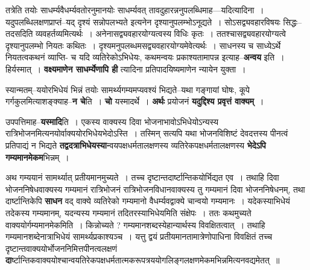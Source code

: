 \documentclass[article,12pt,a4paper]{memoir}
\begin{document}
	तत्रेति तयोः साधर्म्यवैधर्म्यवतोरनुमानयोः साधर्म्यवत् तावदुहारन्ननुपलब्धिमाह—यदित्यादिना । यदुपलब्धिलक्षणप्राप्तं--यद् दृश्यं सन्नोपलभ्यते इत्यनेन दृश्यानुपलम्भोऽनूद्यते । सोऽसद्व्यवहारविषयः सिद्धः--तदसदिति व्यवहर्तव्यमित्यर्थः । अनेनासद्व्यवहारयोग्यत्वस्य विधिः कृतः । ततश्चासद्व्यवहारयोग्यत्वे दृश्यानुपलम्भो नियतः कथितः । दृश्यमनुपलब्धमसद्व्यवहारयोग्यमेवेत्यर्थः । साधनस्य च साध्येऽर्थे नियतत्वकथनं व्याप्ति- च यदि व्यतिरेकोऽभिधेयः, कथमन्वयः प्रकाश्यतामापन्न इत्याह--\textbf{अन्वय} इति । हिर्यस्मात् । \textbf{वक्ष्यमाणेन साधर्म्येणापि ही} त्यादिना प्रतिपादयिष्यमाणेन न्यायेन युक्ता ।
	\pend
      

	  \pstart स्यान्मतम्--ययोरभिधेयं भिन्नं तयोः सामर्थ्यगम्यमप्यवश्यं भिद्यते--यथा गङ्गायां घोषः, कूपे गर्गकुलमित्याशङ्क्याह--\textbf{न चे}ति । \textbf{चो} यस्मादर्थे । \textbf{अर्थः} प्रयोजनं \textbf{यदुद्दिश्य प्रवृत्तं वाक्यम्} ।
	\pend
      

	  \pstart उपपत्तिमाह--\textbf{यस्मादि}ति । एकस्य वाक्यस्य दिवा भोजनाभावोऽभिधेयोऽन्यस्य रात्रिभोजनमित्यनयोर्वाक्य\leavevmode{}योरभिधेयभेदोऽस्ति । तस्मिन् सत्यपि यथा भोजनविशिष्टं देवदत्तस्य पीनत्वं प्रतिपाद्यं न भिद्यते \textbf{तद्वदत्राभिधेयस्या}न्वयपक्षधर्मतालक्षणस्य व्यतिरेकपक्षधर्मतालक्षणस्य \textbf{भेदेऽपि गम्यमानमेकम}भिन्नम् ।
	\pend
      

	  \pstart अथ गम्ययानं सामर्थ्यात् प्रतीयमानमुच्यते । तच्च दृष्टान्तदार्ष्टान्तिकयोर्भिद्यत एव । तथाहि दिवा भोजननिषेधवाक्यस्य गम्यमानं रात्रिभोजनं रात्रिभोजनविधानवाक्यस्य तु गम्यमानं दिवा भोजननिषेधनम्, तथा दार्ष्टान्तिकेपि \textbf{साधन}  वद् वाक्ये व्यतिरेको गम्यमानो वैधर्म्यवद्वाक्ये चान्वयो गम्यमानः । यदेकस्याभिधेयं तदेकस्य गम्यमानम्, यदन्यस्य गम्यमानं तदितरस्याभिधेयमिति संक्षेपः । ततः कथमुच्यते वाक्ययोर्गम्यमानमेकमिति । किन्नोच्यते ? गम्यमानशब्दस्येहान्यार्थस्य विवक्षितत्वात् । तथाहि गम्यमानशब्देनात्राभिधेयं सामर्थ्यप्रकाश्यञ्च । यत्तु द्वयं प्रतीयमानतामात्रेणोपाधिना विवक्षितं तच्च दृष्टान्तवाक्ययोर्भोजननिमित्तपीनत्वलक्षणं \textbf{दा}र्ष्टान्तिकवाक्ययोश्चान्वयतिरेकपक्षधर्मतात्मकरूपत्रययोगलिङ्गलक्षणमेकमभिन्नमित्यनवद्यमेतत् ॥
	\pend
      
\end{document}
